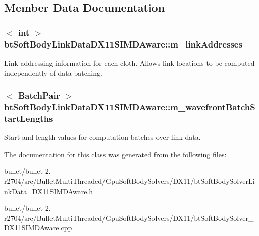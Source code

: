 \subsection{Member Data Documentation}
\hypertarget{classbt_soft_body_link_data_d_x11_s_i_m_d_aware_ac778fd415c477feba8efe6233d62d22a}{
\subsubsection[{m\+\_\+link\+Addresses}]{$<$ int $>$ bt\+Soft\+Body\+Link\+Data\+D\+X11\+S\+I\+M\+D\+Aware\+::m\+\_\+link\+Addresses}}\label{classbt_soft_body_link_data_d_x11_s_i_m_d_aware_ac778fd415c477feba8efe6233d62d22a}
Link addressing information for each cloth. Allows link locations to be computed independently of data batching. \hypertarget{classbt_soft_body_link_data_d_x11_s_i_m_d_aware_a6d72393afb85fed7bde853ce6e1fcc16}{
\subsubsection[{m\+\_\+wavefront\+Batch\+Start\+Lengths}]{$<$ {\bf Batch\+Pair} $>$ bt\+Soft\+Body\+Link\+Data\+D\+X11\+S\+I\+M\+D\+Aware\+::m\+\_\+wavefront\+Batch\+Start\+Lengths}}\label{classbt_soft_body_link_data_d_x11_s_i_m_d_aware_a6d72393afb85fed7bde853ce6e1fcc16}
Start and length values for computation batches over link data. 

The documentation for this class was generated from the following files\+:\begin{DoxyCompactItemize}
\item 
bullet/bullet-\/2.-\/r2704/src/\+Bullet\+Multi\+Threaded/\+Gpu\+Soft\+Body\+Solvers/\+D\+X11/bt\+Soft\+Body\+Solver\+Link\+Data\+\_\+\+D\+X11\+S\+I\+M\+D\+Aware.\+h\item 
bullet/bullet-\/2.-\/r2704/src/\+Bullet\+Multi\+Threaded/\+Gpu\+Soft\+Body\+Solvers/\+D\+X11/bt\+Soft\+Body\+Solver\+\_\+\+D\+X11\+S\+I\+M\+D\+Aware.\+cpp\end{DoxyCompactItemize}
